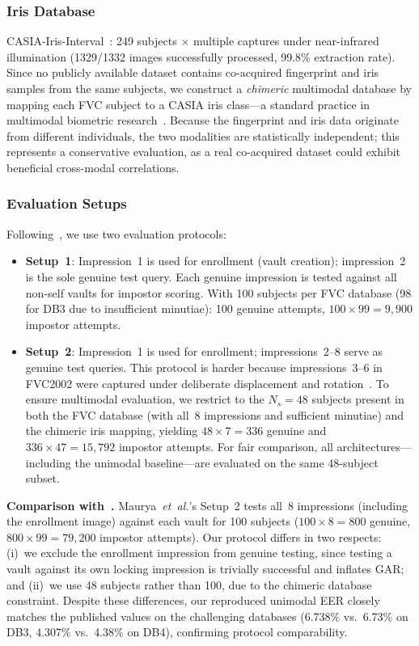 \documentclass[3p,twocolumn]{elsarticle}
\begin{document}
\subsubsection{Iris Database}
CASIA-Iris-Interval~\cite{casia_iris}: 249 subjects $\times$ multiple captures under near-infrared illumination (1329/1332 images successfully processed, 99.8\% extraction rate). Since no publicly available dataset contains co-acquired fingerprint and iris samples from the same subjects, we construct a \emph{chimeric} multimodal database by mapping each FVC subject to a CASIA iris class---a standard practice in multimodal biometric research~\cite{ross2003information,nandakumar2008multibiometric}. Because the fingerprint and iris data originate from different individuals, the two modalities are statistically independent; this represents a conservative evaluation, as a real co-acquired dataset could exhibit beneficial cross-modal correlations.

\subsubsection{Evaluation Setups}
Following~\cite{maurya2025enhancing}, we use two evaluation protocols:
\begin{itemize}
    \item \textbf{Setup~1}: Impression~1 is used for enrollment (vault creation); impression~2 is the sole genuine test query. Each genuine impression is tested against all non-self vaults for impostor scoring. With 100 subjects per FVC database (98 for DB3 due to insufficient minutiae): 100 genuine attempts, $100 \times 99 = 9{,}900$ impostor attempts.
    \item \textbf{Setup~2}: Impression~1 is used for enrollment; impressions~2--8 serve as genuine test queries. This protocol is harder because impressions~3--6 in FVC2002 were captured under deliberate displacement and rotation~\cite{maio2002fvc2002}. To ensure multimodal evaluation, we restrict to the $N_s = 48$ subjects present in both the FVC database (with all~8 impressions and sufficient minutiae) and the chimeric iris mapping, yielding $48 \times 7 = 336$ genuine and $336 \times 47 = 15{,}792$ impostor attempts. For fair comparison, all architectures---including the unimodal baseline---are evaluated on the same 48-subject subset.
\end{itemize}

\noindent\textbf{Comparison with~\cite{maurya2025enhancing}.} Maurya~\textit{et~al.}'s Setup~2 tests all~8 impressions (including the enrollment image) against each vault for 100 subjects ($100 \times 8 = 800$ genuine, $800 \times 99 = 79{,}200$ impostor attempts). Our protocol differs in two respects: (i)~we exclude the enrollment impression from genuine testing, since testing a vault against its own locking impression is trivially successful and inflates GAR; and (ii)~we use 48 subjects rather than 100, due to the chimeric database constraint. Despite these differences, our reproduced unimodal EER closely matches the published values on the challenging databases (6.738\% vs.~6.73\% on DB3, 4.307\% vs.~4.38\% on DB4), confirming protocol comparability.
\end{document}
